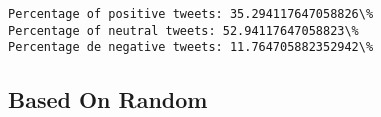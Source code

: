 \documentclass[11pt]{article}
\begin{document}
    \begin{Verbatim}[commandchars=\\\{\}]
Percentage of positive tweets: 35.294117647058826\%
Percentage of neutral tweets: 52.94117647058823\%
Percentage de negative tweets: 11.764705882352942\%

    \end{Verbatim}

    \subsection{Based On Random}\label{based-on-random}


    
    
    
    
\end{document}
